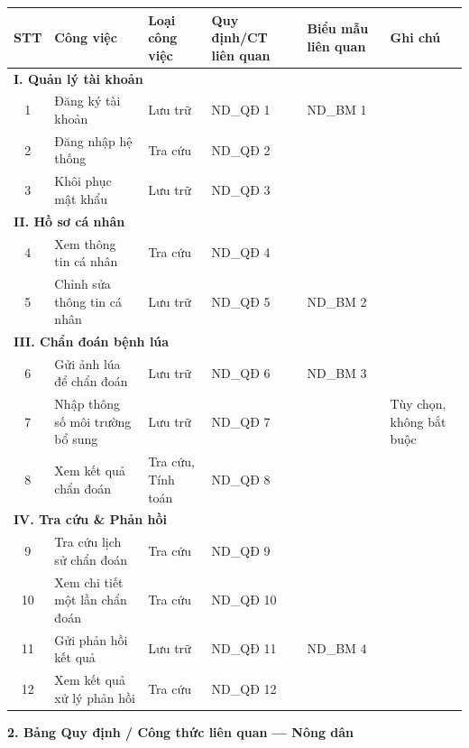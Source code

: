 \documentclass[12pt,a4paper]{article}
\begin{document}
\begin{longtable}{|c|p{3cm}|p{2cm}|p{2.5cm}|p{2cm}|p{2.5cm}|}
\hline
\rowcolor{headerblue}
\textbf{STT} & \textbf{Công việc} & \textbf{Loại công việc} & \textbf{Quy định/CT liên quan} & \textbf{Biểu mẫu liên quan} & \textbf{Ghi chú} \\
\hline
\endhead
\multicolumn{6}{|l|}{\cellcolor{notegreen}\textbf{I. Quản lý tài khoản}} \\
\hline
1 & Đăng ký tài khoản & Lưu trữ & ND\_QĐ 1 & ND\_BM 1 & \\
\hline
2 & Đăng nhập hệ thống & Tra cứu & ND\_QĐ 2 & & \\
\hline
3 & Khôi phục mật khẩu & Lưu trữ & ND\_QĐ 3 & & \\
\hline
\multicolumn{6}{|l|}{\cellcolor{notegreen}\textbf{II. Hồ sơ cá nhân}} \\
\hline
4 & Xem thông tin cá nhân & Tra cứu & ND\_QĐ 4 & & \\
\hline
5 & Chỉnh sửa thông tin cá nhân & Lưu trữ & ND\_QĐ 5 & ND\_BM 2 & \\
\hline
\multicolumn{6}{|l|}{\cellcolor{notegreen}\textbf{III. Chẩn đoán bệnh lúa}} \\
\hline
6 & Gửi ảnh lúa để chẩn đoán & Lưu trữ & ND\_QĐ 6 & ND\_BM 3 & \\
\hline
7 & Nhập thông số môi trường bổ sung & Lưu trữ & ND\_QĐ 7 & & Tùy chọn, không bắt buộc \\
\hline
8 & Xem kết quả chẩn đoán & Tra cứu, Tính toán & ND\_QĐ 8 & & \\
\hline
\multicolumn{6}{|l|}{\cellcolor{notegreen}\textbf{IV. Tra cứu \& Phản hồi}} \\
\hline
9 & Tra cứu lịch sử chẩn đoán & Tra cứu & ND\_QĐ 9 & & \\
\hline
10 & Xem chi tiết một lần chẩn đoán & Tra cứu & ND\_QĐ 10 & & \\
\hline
11 & Gửi phản hồi kết quả & Lưu trữ & ND\_QĐ 11 & ND\_BM 4 & \\
\hline
12 & Xem kết quả xử lý phản hồi & Tra cứu & ND\_QĐ 12 & & \\
\hline
\end{longtable}

\vspace{0.3cm}
\textbf{2. Bảng Quy định / Công thức liên quan --- Nông dân}
\end{document}
